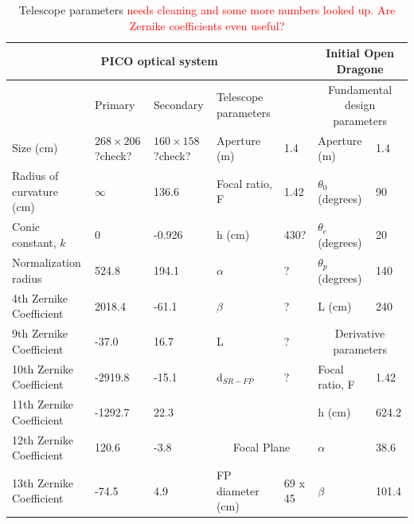 \documentclass[]{spie}  %
\newcommand{\comr}[1]{\textcolor{red}{#1}}
\begin{document}
\begin{table}[ht]
\centering
\caption{Telescope parameters \comr{needs cleaning and some more numbers looked up.  Are Zernike coefficients even useful?} \label{tab:optics}}
\begin{adjustbox}{width=1.1\textwidth}
\begin{tabular}{|l|llll||ll|}
\hline
\multicolumn{5}{|c||}{PICO optical system}                                                            & \multicolumn{2}{c|}{Initial Open Dragone}        \\ \hline
                          & Primary           & Secondary         & Telescope parameters      &     & \multicolumn{2}{c|}{Fundamental design parameters}  \\
Size (cm)                 & $268 \times 206$ ?check? & $160 \times 158$ ?check? & Aperture (m)              & 1.4     & Aperture (m)                   & 1.4   \\
Radius of curvature (cm)  & $\infty$         & 136.6             & Focal ratio, F            & 1.42    & $\theta_0$ (degrees)              & 90    \\
Conic constant, $k$       & 0                 & -0.926            & h (cm)                    & 430?    & $\theta_e$ (degrees)              & 20    \\
Normalization radius      & 524.8             & 194.1             & $\alpha$                  & ?       & $\theta_p$ (degrees)              & 140   \\
4th Zernike Coefficient   & 2018.4            & -61.1             & $\beta$                   &  ?      & L (cm)                         & 240   \\
9th Zernike Coefficient   & -37.0             & 16.7              & L                         &   ?     & \multicolumn{2}{c|}{Derivative parameters}  \\
10th Zernike Coefficient  & -2919.8           & -15.1             & d$_{SR-FP}$               &    ?    & Focal ratio, F                 & 1.42  \\
11th Zernike Coefficient  & -1292.7           & 22.3              &                           &         & h (cm)                         & 624.2 \\
12th Zernike Coefficient  & 120.6             & -3.8              &   \multicolumn{2}{c||}{Focal Plane}  & $\alpha$                          & 38.6  \\
13th Zernike Coefficient  & -74.5             & 4.9               & FP diameter (cm)          & 69 x 45  & $\beta$                           & 101.4 \\

\end{tabular}
\end{adjustbox}
\end{table}
\end{document}
